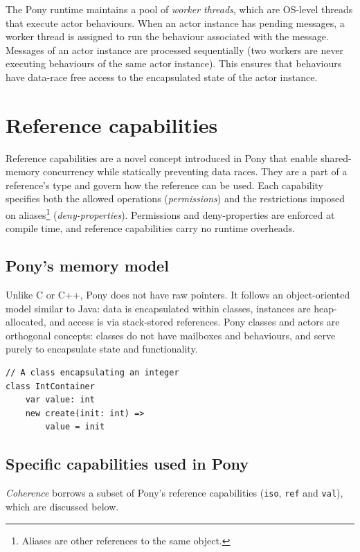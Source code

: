 The Pony runtime maintains a pool of \textit{worker threads}, which are OS-level threads that execute actor behaviours. When an actor instance has pending messages, a worker thread is assigned to run the behaviour associated with the message. Messages of an actor instance are processed sequentially (two workers are never executing behaviours of the same actor instance). This ensures that behaviours have data-race free access to the encapsulated state of the actor instance.

\section{Reference capabilities} \label{sec:ref_cap_pony}
Reference capabilities are a novel concept introduced in Pony that enable shared-memory concurrency while statically preventing data races. They are a part of a reference's type and govern how the reference can be used. Each capability specifies both the allowed operations (\textit{permissions}) and the restrictions imposed on aliases\footnote{Aliases are other references to the same object.} (\textit{deny-properties}). Permissions and deny-properties are enforced at compile time, and reference capabilities carry no runtime overheads.

\subsection{Pony's memory model}
Unlike C or C++, Pony does not have raw pointers. It follows an object-oriented model similar to Java: data is encapsulated within classes, instances are heap-allocated, and access is via stack-stored references. Pony classes and actors are orthogonal concepts: classes do not have mailboxes and behaviours, and serve purely to encapsulate state and functionality.
\begin{verbatim}
// A class encapsulating an integer
class IntContainer
    var value: int
    new create(init: int) =>
        value = init
\end{verbatim}

\subsection{Specific capabilities used in Pony} \label{sec:preparation_pony_specific_capabilities}

\textit{Coherence} borrows a subset of Pony's reference capabilities (\texttt{iso}, \texttt{ref} and \texttt{val}), which are discussed below.


